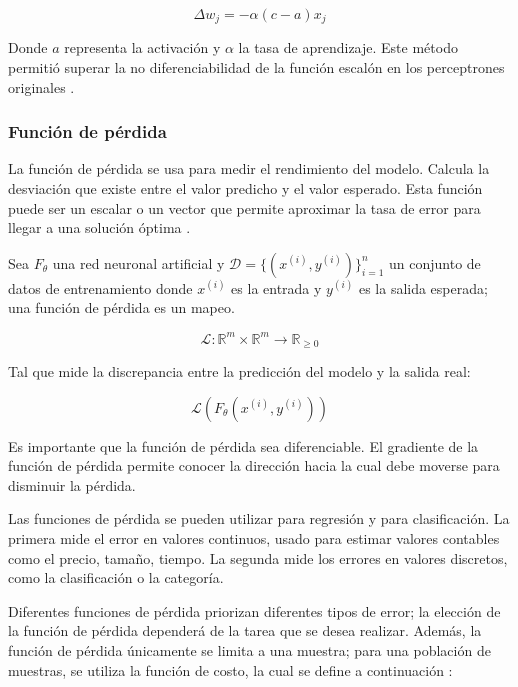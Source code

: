 \[
	\Delta w_j = - \alpha(c- a)x_j
\]

Donde $a$ representa la activación y $\alpha$ la tasa de aprendizaje. Este método permitió superar la no diferenciabilidad de la función escalón en los perceptrones originales \cite{ann_extra}.

\subsubsection{Función de pérdida}

La función de pérdida se usa para medir el rendimiento del modelo. Calcula la desviación que existe entre el valor predicho y el valor esperado. Esta función puede ser un escalar o un vector que permite aproximar la tasa de error para llegar a una solución óptima \cite{funcion_perdida_1}. 

\begin{definition}
	
	Sea $F_\theta$ una red neuronal artificial y $ \mathcal{D} = \{ (x^{(i)}, y^{(i)}) \}_{i = 1}^n $ un conjunto de datos de entrenamiento donde $x^{(i)}$ es la entrada y $y^{(i)}$ es la salida esperada; una función de pérdida es un mapeo. 
	
	\[
	\mathcal{L}: \mathbb{R}^m \times \mathbb{R}^m \to \mathbb{R}_{\geq 0}
	\]
	
	Tal que mide la discrepancia entre la predicción del modelo y la salida real:
	
	\[
	\mathcal{L} (F_\theta (x^{(i)}, y^{(i)}))
	\]
	
	
	
\end{definition}

Es importante que la función de pérdida sea diferenciable. El gradiente de la función de pérdida permite conocer la dirección hacia la cual debe moverse para disminuir la pérdida.

Las funciones de pérdida se pueden utilizar para regresión y para clasificación. La primera mide el error en valores continuos, usado para estimar valores contables como el precio, tamaño, tiempo. La segunda mide los errores en valores discretos, como la clasificación o la categoría.

Diferentes funciones de pérdida priorizan diferentes tipos de error; la elección de la función de pérdida dependerá de la tarea que se desea realizar. Además, la función de pérdida únicamente se limita a una muestra; para una población de muestras, se utiliza la función de costo, la cual se define a continuación \cite{funcion_perdida_1, funcion_perdida_2}:

